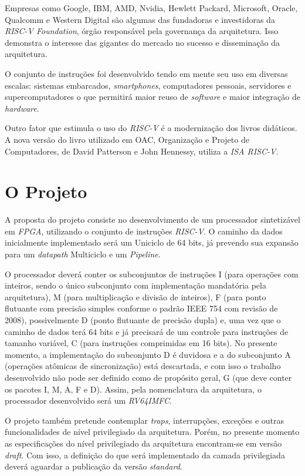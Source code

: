 \documentclass{article}
\begin{document}
    {Empresas como Google, IBM, AMD, Nvidia, Hewlett Packard, Microsoft, Oracle, Qualcomm e Western Digital são algumas das fundadoras e investidoras da \textit{RISC-V Foundation}, órgão responsável pela governança da arquitetura. Isso demonstra o interesse das gigantes do mercado no sucesso e disseminação da arquitetura.}

    {O conjunto de instruções foi desenvolvido tendo em mente seu uso em diversas escalas: sistemas embarcados, \textit{smartphones}, computadores pessoais, servidores e supercomputadores o que permitirá maior reuso de \textit{software} e maior integração de \textit{hardware}.}

    {Outro fator que estimula o uso do \textit{RISC-V} é a modernização dos livros didáticos. A nova versão do livro utilizado em OAC, Organização e Projeto de Computadores, de David Patterson e John Hennessy, utiliza a \textit{ISA RISC-V}.}


\section{O Projeto}

    {A proposta do projeto consiste no desenvolvimento de um processador sintetizável em \textit{FPGA}, utilizando o conjunto de instruções \textit{RISC-V}. O caminho da dados inicialmente implementado será um Uniciclo de 64 bits, já prevendo sua expansão para um \textit{datapath} Multiciclo e um \textit{Pipeline}.}

    {O processador deverá conter os subconjuntos de instruções I (para operações com inteiros, sendo o único subconjunto com implementação mandatória pela arquitetura), M (para multiplicação e divisão de inteiros), F (para ponto flutuante com precisão simples conforme o padrão IEEE 754 com revisão de 2008), possivelmente D (ponto flutuante de precisão dupla) e, uma vez que o caminho de dados terá 64 bits e já precisará de um controle para instruções de tamanho variável, C (para instruções comprimidas em 16 bits). No presente momento, a implementação do subconjunto D é duvidosa e a do subconjunto A (operações atômicas de sincronização) está descartada, e com isso o trabalho desenvolvido não pode ser definido como de propósito geral, G (que deve conter os pacotes I, M, A, F e D). Assim, pela nomenclatura da arquitetura, o processador desenvolvido será um \textit{RV64IMFC}.}

    {O projeto também pretende contemplar \textit{traps}, interrupções, exceções e outras funcionalidades de nível privilegiado da arquitetura. Porém, no presente momento as especificações do nível privilegiado da arquitetura encontram-se em versão \textit{draft}. Com isso, a definição do que será implementado da camada privilegiada deverá aguardar a publicação da versão \textit{standard}.}
\end{document}
